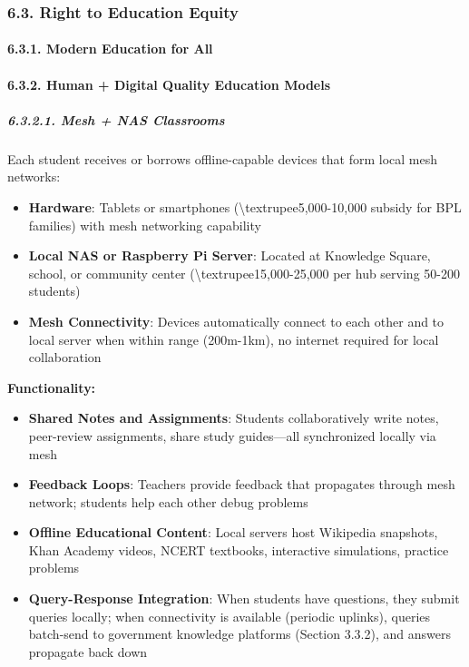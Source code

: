 \subsubsection{6.3. Right to Education
Equity}\label{right-to-education-equity}

\paragraph{6.3.1. Modern Education for
All}\label{modern-education-for-all}

\paragraph{6.3.2. Human + Digital Quality Education
Models}\label{human-digital-quality-education-models}

\subparagraph{6.3.2.1. Mesh + NAS Classrooms}\label{mesh-nas-classrooms}

Each student receives or borrows offline-capable devices that form local
mesh networks:

\begin{itemize}
\tightlist
\item
  \textbf{Hardware}: Tablets or smartphones
  (\textbackslash textrupee5,000-10,000 subsidy for BPL families) with
  mesh networking capability
\item
  \textbf{Local NAS or Raspberry Pi Server}: Located at Knowledge
  Square, school, or community center
  (\textbackslash textrupee15,000-25,000 per hub serving 50-200
  students)
\item
  \textbf{Mesh Connectivity}: Devices automatically connect to each
  other and to local server when within range (200m-1km), no internet
  required for local collaboration
\end{itemize}

\textbf{Functionality:}

\begin{itemize}
\tightlist
\item
  \textbf{Shared Notes and Assignments}: Students collaboratively write
  notes, peer-review assignments, share study guides---all synchronized
  locally via mesh
\item
  \textbf{Feedback Loops}: Teachers provide feedback that propagates
  through mesh network; students help each other debug problems
\item
  \textbf{Offline Educational Content}: Local servers host Wikipedia
  snapshots, Khan Academy videos, NCERT textbooks, interactive
  simulations, practice problems
\item
  \textbf{Query-Response Integration}: When students have questions,
  they submit queries locally; when connectivity is available (periodic
  uplinks), queries batch-send to government knowledge platforms
  (Section 3.3.2), and answers propagate back down
\end{itemize}

